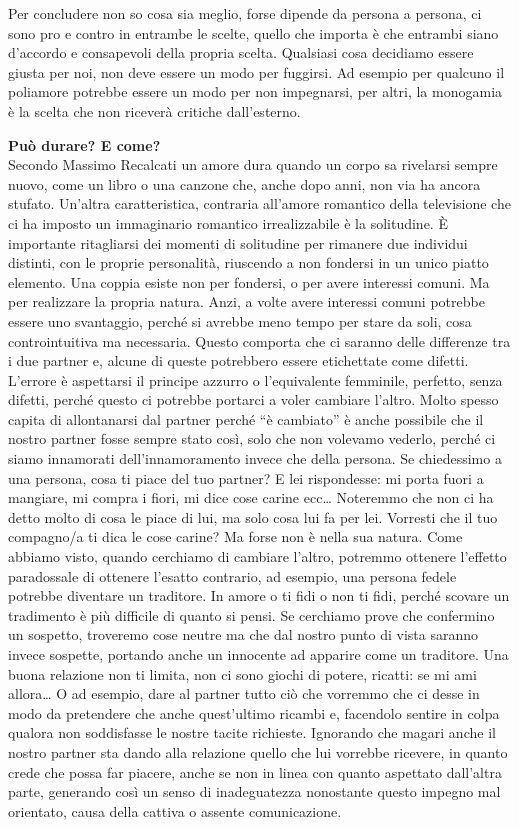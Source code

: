 \documentclass[12pt]{book} %
\begin{document}
Per concludere non so cosa sia meglio, forse dipende da persona a persona, ci sono pro e contro in entrambe le scelte,
quello che importa è che entrambi siano d'accordo e consapevoli della propria scelta. Qualsiasi
cosa decidiamo essere giusta per noi, non deve essere un modo per fuggirsi. Ad esempio per qualcuno il poliamore
potrebbe essere un modo per non impegnarsi, per altri, la monogamia è la scelta che non riceverà critiche dall'esterno.

\noindent \textbf{\large Può durare? E come?} \\
Secondo Massimo Recalcati un amore dura quando un corpo sa rivelarsi sempre nuovo, come un libro o una canzone che,
anche dopo anni, non via ha ancora stufato. Un'altra caratteristica, contraria
all'amore romantico della televisione che ci ha imposto un immaginario romantico irrealizzabile è
la solitudine. È importante ritagliarsi dei momenti di solitudine per rimanere due individui distinti, con le proprie
personalità, riuscendo a non fondersi in un unico piatto elemento. Una coppia esiste non per fondersi, o per avere
interessi comuni. Ma per realizzare la propria natura. Anzi, a volte avere interessi comuni potrebbe essere uno
svantaggio, perché si avrebbe meno tempo per stare da soli, cosa controintuitiva ma necessaria. Questo comporta che ci
saranno delle differenze tra i due partner e, alcune di queste potrebbero essere etichettate come difetti.
L'errore è aspettarsi il principe azzurro o l'equivalente femminile,
perfetto, senza difetti, perché questo ci potrebbe portarci a voler cambiare l'altro. Molto
spesso capita di allontanarsi dal partner perché “è cambiato” è anche possibile che il nostro partner fosse sempre stato così, solo che non
volevamo vederlo, perché ci siamo innamorati dell'innamoramento invece che della persona. Se
chiedessimo a una persona, cosa ti piace del tuo partner? E lei rispondesse: mi porta fuori a mangiare, mi compra i
fiori, mi dice cose carine ecc… Noteremmo che non ci ha detto molto di cosa le piace di lui, ma solo cosa lui fa per
lei. 
Vorresti che il tuo compagno/a ti dica le cose carine? Ma forse non è nella sua natura.
Come abbiamo visto, quando cerchiamo di cambiare l'altro, potremmo ottenere
l'effetto paradossale di ottenere l'esatto contrario, ad esempio, una persona
fedele potrebbe diventare un traditore. In amore o ti fidi o non ti fidi, perché scovare un tradimento è più difficile di
quanto si pensi. Se cerchiamo prove che confermino un sospetto, troveremo cose neutre ma che dal nostro punto di vista
saranno invece sospette, portando anche un innocente ad apparire come un traditore. Una buona relazione non ti limita,
non ci sono giochi di potere, ricatti: se mi ami allora… O ad esempio, dare al partner tutto ciò che vorremmo che
ci desse in modo da pretendere che anche quest'ultimo ricambi e, facendolo sentire in colpa
qualora non soddisfasse le nostre tacite richieste. Ignorando che magari anche il nostro partner sta dando alla
relazione quello che lui vorrebbe ricevere, in quanto crede che possa far piacere, anche se non in linea con quanto
aspettato dall'altra parte, generando così un senso di inadeguatezza nonostante questo impegno mal
orientato, causa della cattiva o assente comunicazione.
\end{document}
